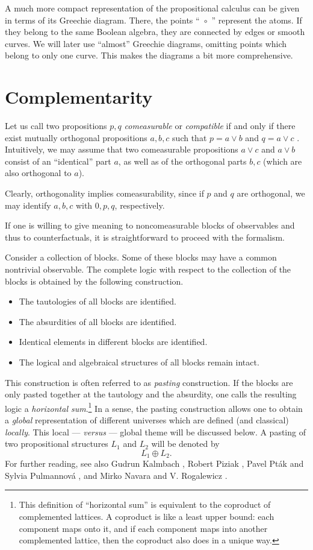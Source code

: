 \documentclass[%
  preprint,
 showpacs,
 showkeys,
 preprintnumbers,
 amsmath,amssymb,
 aps,
 rmp,
  longbibliography,
 ]{revtex4-1}
\begin{document}
A much more compact representation of the propositional calculus can be
given in terms of
its Greechie diagram.
 There, the  points ``~$\circ$~'' represent
the atoms.
\label{greechie-diagram}
If they belong to the same Boolean
algebra, they are connected by edges or smooth curves.
We will later use ``almost''
Greechie diagrams,
omitting points which belong to only one curve. This makes the
diagrams a bit more comprehensive.

\section{Complementarity}
Let us call two propositions $p,q$ {\em comeasurable}
or {\em compatible}
if and only if there exist mutually orthogonal propositions  $a,b,c$
such that $p=a\vee b$ and $q=a\vee c$
\cite[p. 118]{varadarajanI}.
Intuitively, we may assume that two comeasurable propositions $a\vee c$
and $a\vee b$ consist of an
``identical'' part $a$, as well as of the orthogonal  parts $b,c$ (which
are also orthogonal to $a$).

  Clearly, orthogonality implies
comeasurability, since if
$p$ and
$q$ are orthogonal, we may identify
$a, b, c$ with $0,p,q$, respectively.

If one is willing to give meaning to noncomeasurable blocks of
observables and thus to counterfactuals, it is straightforward to
proceed with the formalism.

Consider a collection of blocks.
 Some of these blocks may have a common nontrivial
observable. The complete logic with respect to the collection of the
blocks is obtained by the following construction.
\begin{itemize}
\item
The tautologies of all blocks are identified.
\item
The absurdities of all blocks are identified.
\item
Identical elements in different blocks are identified.
\item
The logical and algebraical structures of all blocks remain intact.
\end{itemize}
This construction is often referred to as {\em pasting} construction.
If the blocks are only pasted together at the tautology and
the absurdity, one calls the resulting logic a {\em horizontal
sum}.\footnote{This definition of ``horizontal sum'' is equivalent to
the coproduct of complemented lattices. A coproduct is like a least
upper bound: each component maps onto it, and if each component maps
into another complemented lattice, then the coproduct also does in a
unique way.} \label{l-horsum}
In a sense, the pasting construction allows one to obtain a {\em global}
representation of different universes which are defined (and classical)
{\em locally}. This local --- {\it versus} --- global theme will be
discussed
below.
A pasting of two propositional structures $L_1$ and $L_2$ will be
denoted by
$$L_1\oplus L_2.$$
 For further reading, see
also
Gudrun Kalmbach \cite{kalmbach-83,kalmbach-86},
Robert Piziak
\cite{piz-88},
Pavel Pt{\'{a}}k and Sylvia Pulmannov{\'{a}}
\cite{pulmannova-91}, and
Mirko Navara and V. Rogalewicz
\cite{nav:91}.
\end{document}
